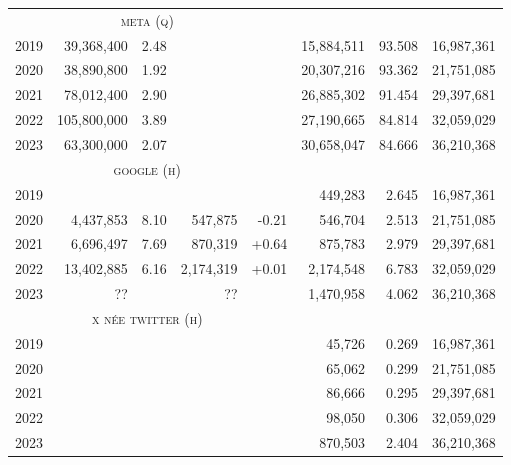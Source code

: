 \documentclass[nonacm,screen]{acmart}
\newcommand\missing{\multicolumn{1}{r}{??}}
\begin{document}
\begin{itemize}
\begin{table}
\begin{tabular}{r@{\hskip 1.5em}rrr r@{\hskip 1.5em}rrr}
& \multicolumn{3}{c}{\textsc{\MakeLowercase{Meta (Q)}}} & & & & \\ \cmidrule{2-4}
\color{lowlight} 2019 &  39,368,400 &   2.48 &            &         & 15,884,511 & 93.508 & \color{lowlight} 16,987,361 \\
\color{lowlight} 2020 &  38,890,800 &   1.92 &            &         & 20,307,216 & 93.362 & \color{lowlight} 21,751,085 \\
\color{lowlight} 2021 &  78,012,400 &   2.90 &            &         & 26,885,302 & 91.454 & \color{lowlight} 29,397,681 \\
\color{lowlight} 2022 & 105,800,000 &   3.89 &            &         & 27,190,665 & 84.814 & \color{lowlight} 32,059,029 \\
\color{lowlight} 2023 &  63,300,000 &   2.07 &            &         & 30,658,047 & 84.666 & \color{lowlight} 36,210,368 \\[2ex]

& \multicolumn{3}{c}{\textsc{\MakeLowercase{Google (H)}}} & & & & \\ \cmidrule{2-4}
\color{lowlight} 2019 &             &        &            &         &    449,283 &  2.645 & \color{lowlight} 16,987,361 \\
\color{lowlight} 2020 &   4,437,853 &   8.10 &    547,875 &   -0.21 &    546,704 &  2.513 & \color{lowlight} 21,751,085 \\
\color{lowlight} 2021 &   6,696,497 &   7.69 &    870,319 &   +0.64 &    875,783 &  2.979 & \color{lowlight} 29,397,681 \\
\color{lowlight} 2022 &  13,402,885 &   6.16 &  2,174,319 &   +0.01 &  2,174,548 &  6.783 & \color{lowlight} 32,059,029 \\
\color{lowlight} 2023 &    \missing &        &   \missing &         &  1,470,958 &  4.062 & \color{lowlight} 36,210,368 \\[2ex]

& \multicolumn{3}{c}{\textsc{\MakeLowercase{X née Twitter (H)}}} & & & & \\ \cmidrule{2-4}
\color{lowlight} 2019 &             &        &           &          &     45,726 &  0.269 & \color{lowlight} 16,987,361 \\
\color{lowlight} 2020 &             &        &           &          &     65,062 &  0.299 & \color{lowlight} 21,751,085 \\
\color{lowlight} 2021 &             &        &           &          &     86,666 &  0.295 & \color{lowlight} 29,397,681 \\
\color{lowlight} 2022 &             &        &           &          &     98,050 &  0.306 & \color{lowlight} 32,059,029 \\
\color{lowlight} 2023 &             &        &           &          &    870,503 &  2.404 & \color{lowlight} 36,210,368 \\[2ex]


\end{tabular}
\end{table}
\end{itemize}
\end{document}

